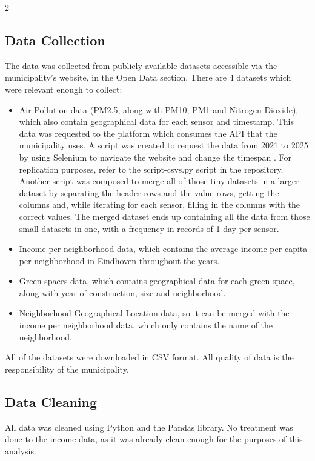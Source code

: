 \documentclass[12pt, a4paper]{article}
\begin{document}
\begin{multicols}{2}
    \subsection{Data Collection}
    The data was collected from publicly available datasets accessible via the municipality's website, in the Open Data section. There are 4 datasets which were relevant enough to collect:
    \begin{itemize}
        \item Air Pollution data (PM2.5, along with PM10, PM1 and Nitrogen Dioxide), which also contain geographical data for each sensor and timestamp. This data was requested to the platform which consumes the API that the municipality uses. A script was created to request the data from 2021 to 2025 by using Selenium to navigate the website and change the timespan \cite{eindhoven_pm25_data}. For replication purposes, refer to the script-csvs.py script in the repository. Another script was composed to merge all of those tiny datasets in a larger dataset by separating the header rows and the value rows, getting the columns and, while iterating for each sensor, filling in the columns with the correct values. The merged dataset ends up containing all the data from those small datasets in one, with a frequency in records of 1 day per sensor.
        \item Income per neighborhood data, which contains the average income per capita per neighborhood in Eindhoven throughout the years. \cite{eindhoven_incijfers}
        \item Green spaces data, which contains geographical data for each green space, along with year of construction, size and neighborhood. \cite{eindhoven_groen_data}
        \item Neighborhood Geographical Location data, so it can be merged with the income per neighborhood data, which only contains the name of the neighborhood. \cite{eindhoven_buurten_data}
    \end{itemize}
    All of the datasets were downloaded in CSV format.
    All quality of data is the responsibility of the municipality.
    \subsection{Data Cleaning}
    All data was cleaned using Python and the Pandas library.
    No treatment was done to the income data, as it was already clean enough for the purposes of this analysis.

\end{multicols}
\end{document}
